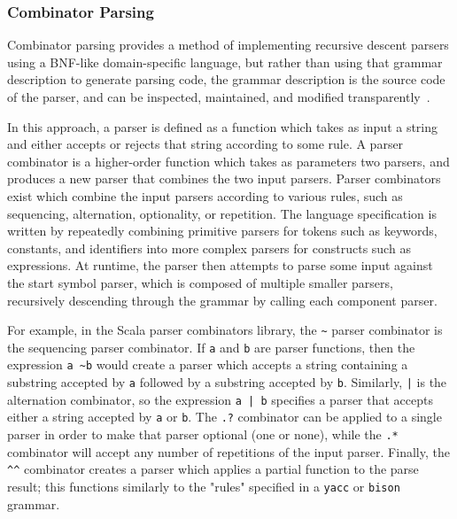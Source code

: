 \subsubsection{Combinator Parsing}

Combinator parsing provides a method of implementing recursive descent parsers using a BNF-like domain-specific language,  but rather than using that grammar description to generate parsing code, the grammar description is the source code of the parser, and can be inspected, maintained, and modified transparently~\cite{ghosh2010dsls,hofer2008polymorphic,moors2008parser}.

In this approach, a parser is defined as a function which takes as input a string and either accepts or rejects that string according to some rule. A parser combinator is a higher-order function which takes as parameters two parsers, and produces a new parser that combines the two input parsers. Parser combinators exist which combine the input parsers according to various rules, such as sequencing, alternation, optionality, or repetition. The language specification is written by repeatedly combining primitive parsers for tokens such as keywords, constants, and identifiers into more complex parsers for constructs such as expressions. At runtime, the parser then attempts to parse some input against the start symbol parser, which is composed of multiple smaller parsers, recursively descending through the grammar by calling each component parser.~\cite{moors2008parser,swierstra2001combinator,fokker1995functional,frost2008parser}

For example, in the Scala parser combinators library, the \texttt{\textasciitilde} parser combinator is the sequencing parser combinator. If \texttt{a} and \texttt{b} are parser functions, then the expression \texttt{a \textasciitilde b} would create a parser which accepts a string containing a substring accepted by \texttt{a} followed by a substring accepted by \texttt{b}. Similarly,  \texttt{|} is the alternation combinator, so the expression \texttt{a | b} specifies a parser that accepts either a string accepted by \texttt{a} or \texttt{b}.  The \texttt{.?} combinator can be applied to a single parser in order to make that parser optional (one or none), while the \texttt{.*} combinator will accept any number of repetitions of the input parser.  Finally, the \verb!^^! combinator creates a parser which applies a partial function to the parse result; this functions similarly to the "rules" specified in a \texttt{yacc} or \texttt{bison} grammar.

